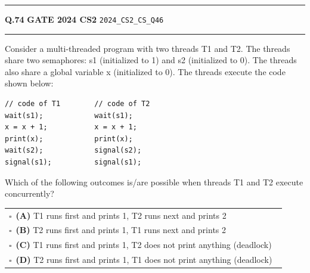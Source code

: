 \documentclass[a4paper,10pt]{article}
\begin{document}
\vspace{6pt}\hrule height 0.35pt\vspace{6pt}
\noindent
\begin{tcolorbox}[
    blanker,
    sidebyside,
    sidebyside align=top,
    lefthand width=0.55\textwidth,
    top=4pt, bottom=4pt, left=0pt, right=0pt,
    middle=16pt,
    underlay={
        \draw[dashed, black!80, line width=0.8pt, dash pattern=on 4pt off 3pt]
            ([xshift=0.55\textwidth+8pt]frame.north west) --
            ([xshift=0.55\textwidth+8pt]frame.south west);
    }
]
\textbf{Q.74}  \hfill {\footnotesize\textbf{GATE 2024 CS2} \quad \tiny\texttt{2024\_CS2\_CS\_Q46}}
\vspace{2pt}\hrule height 0.3pt\vspace{4pt}

Consider a multi-threaded program with two threads T1 and T2. The threads share two semaphores: s1 (initialized to 1) and s2 (initialized to 0). The threads also share a global variable x (initialized to 0). The threads execute the code shown below:
\begin{verbatim}
// code of T1        // code of T2
wait(s1);            wait(s1);
x = x + 1;           x = x + 1;
print(x);            print(x);
wait(s2);            signal(s2);
signal(s1);          signal(s1);
\end{verbatim}
Which of the following outcomes is/are possible when threads T1 and T2 execute concurrently?

\par\vspace{6pt}\noindent
\begin{tabular}{@{}p{0.98\linewidth}@{}}
$\square$\ \textbf{(A)} T1 runs first and prints 1, T2 runs next and prints 2 \\
\addlinespace[3pt]
$\square$\ \textbf{(B)} T2 runs first and prints 1, T1 runs next and prints 2 \\
\addlinespace[3pt]
$\square$\ \textbf{(C)} T1 runs first and prints 1, T2 does not print anything (deadlock) \\
\addlinespace[3pt]
$\square$\ \textbf{(D)} T2 runs first and prints 1, T1 does not print anything (deadlock)
\end{tabular}

\tcblower


\end{tcolorbox}
\end{document}
